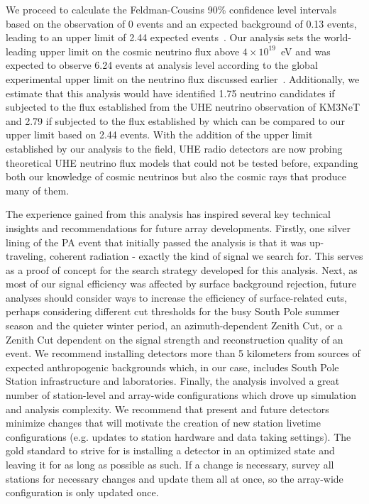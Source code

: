 We proceed to calculate the Feldman-Cousins 90\% confidence level intervals based on the observation of 0 events and an expected background of 0.13 events, leading to an upper limit of 2.44 expected events~\citep{feldman_cousins}. 
Our analysis sets the world-leading upper limit on the cosmic neutrino flux above $4 \times 10^{19}$~eV and was expected to observe 6.24 events at analysis level according to the global experimental upper limit on the neutrino flux discussed earlier~\citep{icecube_search-ehe, anita_iv}. 
Additionally, we estimate that this analysis would have identified 1.75 neutrino candidates if subjected to the flux established from the UHE neutrino observation of KM3NeT \citep{km3net_neutrino} and 2.79 if subjected to the flux established by \citep{flux-muzio} which can be compared to our upper limit based on 2.44 events.%
With the addition of the upper limit established by our analysis to the field, UHE radio detectors are now probing theoretical UHE neutrino flux models that could not be tested before, expanding both our knowledge of cosmic neutrinos but also the cosmic rays that produce many of them.

The experience gained from this analysis has inspired several key technical insights and recommendations for future array developments.
Firstly, one silver lining of the PA event that initially passed the analysis is that it was up-traveling, coherent radiation - exactly the kind of signal we search for. 
This serves as a proof of concept for the search strategy developed for this analysis. 
Next, as most of our signal efficiency was affected by surface background rejection, future analyses should consider ways to increase the efficiency of surface-related cuts, perhaps considering different cut thresholds for the busy South Pole summer season and the quieter winter period, an azimuth-dependent Zenith Cut, or a Zenith Cut dependent on the signal strength and reconstruction quality of an event. 
We recommend installing detectors more than 5 kilometers from sources of expected anthropogenic backgrounds which, in our case, includes South Pole Station infrastructure and laboratories. 
Finally, the analysis involved a great number of station-level and array-wide configurations which drove up simulation and analysis complexity. 
We recommend that present and future detectors minimize changes that will motivate the creation of new station livetime configurations (e.g. updates to station hardware and data taking settings). 
The gold standard to strive for is installing a detector in an optimized state and leaving it for as long as possible as such. 
If a change is necessary, survey all stations for necessary changes and update them all at once, so the array-wide configuration is only updated once. 


